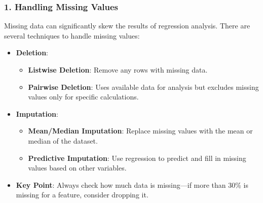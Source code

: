 \documentclass{beamer}
\begin{document}
\begin{frame}[fragile]
    \frametitle{1. Handling Missing Values}
    Missing data can significantly skew the results of regression analysis. There are several techniques to handle missing values:
    
    \begin{itemize}
        \item \textbf{Deletion}:
        \begin{itemize}
            \item \textbf{Listwise Deletion}: Remove any rows with missing data.
            \item \textbf{Pairwise Deletion}: Uses available data for analysis but excludes missing values only for specific calculations.
        \end{itemize}
        
        \item \textbf{Imputation}:
        \begin{itemize}
            \item \textbf{Mean/Median Imputation}: Replace missing values with the mean or median of the dataset.
            \item \textbf{Predictive Imputation}: Use regression to predict and fill in missing values based on other variables.
        \end{itemize}
        
        \item \textbf{Key Point}: Always check how much data is missing—if more than 30\% is missing for a feature, consider dropping it.
    \end{itemize}
\end{frame}
\end{document}
